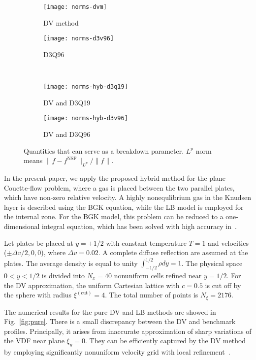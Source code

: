 \documentclass[]{elsarticle} %
\begin{document}
{\begin{figure}
    \centering
    \begin{subfigure}[b]{0.5\textwidth}
        \texttt{[image: norms-dvm]}
        \caption{DV method}
        \label{fig:norms:dvm}
    \end{subfigure}%
    \begin{subfigure}[b]{0.5\textwidth}
        \texttt{[image: norms-d3v96]}
        \caption{D3Q96}
        \label{fig:norms:d3q96}
    \end{subfigure}\\
    \begin{subfigure}[b]{0.5\textwidth}
        \texttt{[image: norms-hyb-d3q19]}
        \caption{DV and D3Q19}
        \label{fig:norms:d3q19-hyb}
    \end{subfigure}%
    \begin{subfigure}[b]{0.5\textwidth}
        \texttt{[image: norms-hyb-d3v96]}
        \caption{DV and D3Q96}
        \label{fig:norms:d3q96-hyb}
    \end{subfigure}
    \caption{
        Quantities that can serve as a breakdown parameter. \(L^p\) norm means \(\|f-f^{\mathrm{NSF}}\|_{L^p}/\|f\|\).
    }\label{fig:norms}
\end{figure}

In the present paper, we apply the proposed hybrid method for the plane Couette-flow problem,
where a gas is placed between the two parallel plates, which have non-zero relative velocity.
A highly nonequlibrium gas in the Knudsen layer is described using the BGK equation, while the LB model is employed for the internal zone.
For the BGK model, this problem can be reduced to a one-dimensional integral equation,
which has been solved with high accuracy in~\cite{Luo2015, Luo2016}.

Let plates be placed at $y = \pm 1/2$ with constant temperature $T = 1$ and velocities ($\pm\Delta v/2,0,0$), where $\Delta v=0.02$.
A complete diffuse reflection are assumed at the plates.
The average density is equal to unity $\int_{-1/2}^{1/2}\rho dy=1$.
The physical space $0 < y < 1/2$ is divided into $N_x = 40$ nonuniform cells refined near $y = 1/2$.
For the DV approximation, the uniform Cartesian lattice with $c=0.5$ is cut off by the sphere with radius $\xi^{(\mathrm{cut})}=4$.
The total number of points is $N_\xi=2176$.

The numerical results for the pure DV and LB methods are showed in Fig.~\ref{fig:pure}.
There is a small discrepancy between the DV and benchmark profiles.
Principally, it arises from inaccurate approximation of sharp variations of the VDF near plane \(\xi_y=0\).
They can be efficiently captured by the DV method by employing significantly nonuniform velocity grid
with local refinement~\cite{Ohwada1990, Rogozin2016}.

}
\end{document}
